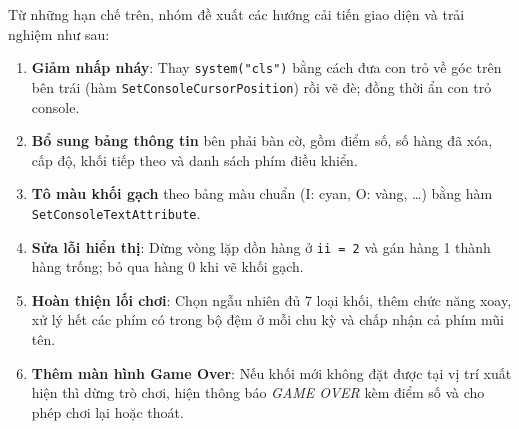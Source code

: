 Từ những hạn chế trên, nhóm đề xuất các hướng cải tiến giao diện và trải nghiệm như sau:
\begin{enumerate}
    \item \textbf{Giảm nhấp nháy}: Thay \texttt{system("cls")} bằng cách đưa con trỏ về góc trên bên trái (hàm \texttt{SetConsole\allowbreak CursorPosition}) rồi vẽ đè; đồng thời ẩn con trỏ console.
    \item \textbf{Bổ sung bảng thông tin} bên phải bàn cờ, gồm điểm số, số hàng đã xóa, cấp độ, khối tiếp theo và danh sách phím điều khiển.
    \item \textbf{Tô màu khối gạch} theo bảng màu chuẩn (I: cyan, O: vàng, \dots) bằng hàm \texttt{SetConsole\allowbreak TextAttribute}.
    \item \textbf{Sửa lỗi hiển thị}: Dừng vòng lặp dồn hàng ở \texttt{ii = 2} và gán hàng 1 thành hàng trống; bỏ qua hàng 0 khi vẽ khối gạch.
    \item \textbf{Hoàn thiện lối chơi}: Chọn ngẫu nhiên đủ 7 loại khối, thêm chức năng xoay, xử lý hết các phím có trong bộ đệm ở mỗi chu kỳ và chấp nhận cả phím mũi tên.
    \item \textbf{Thêm màn hình Game Over}: Nếu khối mới không đặt được tại vị trí xuất hiện thì dừng trò chơi, hiện thông báo \textit{GAME OVER} kèm điểm số và cho phép chơi lại hoặc thoát.
\end{enumerate}
